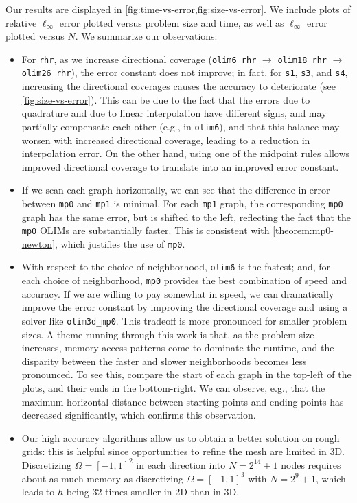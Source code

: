 \documentclass{article}
\begin{document}
Our results are displayed in
\cref{fig:time-vs-error,fig:size-vs-error}. We include plots of
relative $\ell_\infty$ error plotted versus problem size and time, as
well as $\ell_\infty$ error plotted versus $N$. We summarize our
observations:
\begin{itemize}
\item For \texttt{rhr}, as we increase directional coverage
  (\texttt{olim6\_rhr} $\to$ \texttt{olim18\_rhr} $\to$
  \texttt{olim26\_rhr}), the error constant does not improve; in fact,
  for \texttt{s1}, \texttt{s3}, and \texttt{s4}, increasing the
  directional coverages causes the accuracy to deteriorate (see
  \cref{fig:size-vs-error}). This can be due to the fact that the
  errors due to quadrature and due to linear interpolation have
  different signs, and may partially compensate each other (e.g., in
  \texttt{olim6}), and that this balance may worsen with increased
  directional coverage, leading to a reduction in interpolation error.
  On the other hand, using one of the midpoint rules allows improved
  directional coverage to translate into an improved error constant.
\item If we scan each graph horizontally, we can see that the
  difference in error between \texttt{mp0} and \texttt{mp1} is
  minimal. For each \texttt{mp1} graph, the corresponding \texttt{mp0}
  graph has the same error, but is shifted to the left, reflecting the
  fact that the \texttt{mp0} OLIMs are substantially faster. This is
  consistent with \cref{theorem:mp0-newton}, which justifies the use
  of \texttt{mp0}.
\item With respect to the choice of neighborhood, \texttt{olim6} is
  the fastest; and, for each choice of neighborhood, \texttt{mp0}
  provides the best combination of speed and accuracy. If we are
  willing to pay somewhat in speed, we can dramatically improve the
  error constant by improving the directional coverage and using a
  solver like \texttt{olim3d\_mp0}. This tradeoff is more pronounced
  for smaller problem sizes. A theme running through this work is
  that, as the problem size increases, memory access patterns come to
  dominate the runtime, and the disparity between the faster and
  slower neighborhoods becomes less pronounced. To see this, compare
  the start of each graph in the top-left of the plots, and their ends
  in the bottom-right. We can observe, e.g., that the maximum
  horizontal distance between starting points and ending points has
  decreased significantly, which confirms this observation.
\item Our high accuracy algorithms allow us to obtain a better
  solution on rough grids: this is helpful since opportunities to
  refine the mesh are limited in 3D. Discretizing $\Omega = [-1, 1]^2$
  in each direction into $N = 2^{14} + 1$ nodes requires about as much
  memory as discretizing $\Omega = [-1, 1]^3$ with $N = 2^{9} + 1$,
  which leads to $h$ being 32 times smaller in 2D than in 3D.
\end{itemize}
\end{document}
